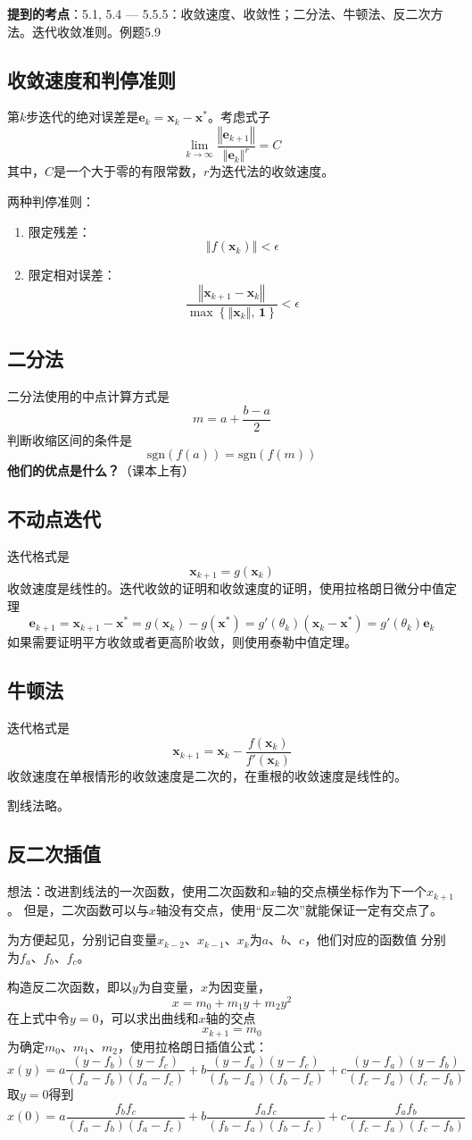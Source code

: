 \documentclass[14pt, letterpaper, UTF8, fontset=windowsnew, heading=true]{article}
\providecommand{\norm}[1]{\left\Vert#1\right\Vert}
\begin{document}
\textbf{提到的考点}：5.1, 5.4 --- 5.5.5：收敛速度、收敛性；二分法、牛顿法、反二次方法。迭代收敛准则。例题5.9

\subsection{收敛速度和判停准则}
第$k$步迭代的绝对误差是$\bm{e}_k=\bm{x}_k-\bm{x}^{\ast}$。考虑式子
$$\lim_{k\rightarrow \infty}\frac{\norm{\bm{e}_{k+1}}}{\norm{\bm{e}_k}^r}=C$$
其中，$C$是一个大于零的有限常数，$r$为迭代法的收敛速度。

\par
两种判停准则：
\begin{enumerate}
	\item
	限定残差：
	$$\norm{f(\bm{x}_k)} < \epsilon$$
	\item
	限定相对误差：
	$$\frac{\norm{\bm{x}_{k+1}-\bm{x}_k}}{\max \left\{ \norm{\bm{x}_k},\, \bm{1} \right\} } < \epsilon$$
\end{enumerate}

\subsection{二分法}
二分法使用的中点计算方式是
$$m=a+\frac{b-a}{2}$$
判断收缩区间的条件是
$$\text{sgn}(f(a))=\text{sgn}(f(m))$$
\textbf{他们的优点是什么？}（课本上有）

\subsection{不动点迭代}
迭代格式是
$$\bm{x}_{k+1}=g(\bm{x}_k)$$
收敛速度是线性的。迭代收敛的证明和收敛速度的证明，使用拉格朗日微分中值定理
$$\bm{e}_{k+1}=\bm{x}_{k+1}-\bm{x}^{\ast}
=g(\bm{x}_k)-g(\bm{x}^{\ast})=g'(\theta_k)(\bm{x}_k-\bm{x}^{\ast})
=g'(\theta_k)\bm{e}_k$$
如果需要证明平方收敛或者更高阶收敛，则使用泰勒中值定理。

\subsection{牛顿法}
迭代格式是
$$\bm{x}_{k+1}=\bm{x}_k-\frac{f(\bm{x}_k)}{f'(\bm{x}_k)}$$
收敛速度在单根情形的收敛速度是二次的，在重根的收敛速度是线性的。
\par
割线法略。

\subsection{反二次插值}
想法：改进割线法的一次函数，使用二次函数和$x$轴的交点横坐标作为下一个$x_{k+1}$。
但是，二次函数可以与$x$轴没有交点，使用“反二次”就能保证一定有交点了。
\par
为方便起见，分别记自变量$x_{k-2}$、$x_{k-1}$、$x_{k}$为$a$、$b$、$c$，他们对应的函数值
分别为$f_a$、$f_b$、$f_c$。
\par
构造反二次函数，即以$y$为自变量，$x$为因变量，
$$x=m_0+m_1y+m_2y^2$$
在上式中令$y=0$，可以求出曲线和$x$轴的交点
$$x_{k+1}=m_0$$
为确定$m_0$、$m_1$、$m_2$，使用拉格朗日插值公式：
$$x(y)=a\frac{(y-f_b)(y-f_c)}{(f_a-f_b)(f_a-f_c)}+b\frac{(y-f_a)(y-f_c)}{(f_b-f_a)(f_b-f_c)}+c\frac{(y-f_a)(y-f_b)}{(f_c-f_a)(f_c-f_b)}$$
取$y=0$得到
$$x(0)=a\frac{f_bf_c}{(f_a-f_b)(f_a-f_c)}+b\frac{f_af_c}{(f_b-f_a)(f_b-f_c)}+c\frac{f_af_b}{(f_c-f_a)(f_c-f_b)}$$
\end{document}
